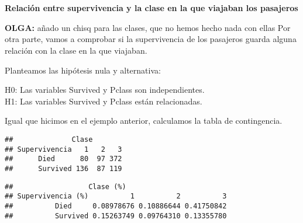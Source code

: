 \documentclass[
]{article}
\newenvironment{Shaded}{\begin{snugshade}}{\end{snugshade}}
\newcommand{\CommentTok}[1]{\textcolor[rgb]{0.56,0.35,0.01}{\textit{#1}}}
\newcommand{\DataTypeTok}[1]{\textcolor[rgb]{0.13,0.29,0.53}{#1}}
\newcommand{\KeywordTok}[1]{\textcolor[rgb]{0.13,0.29,0.53}{\textbf{#1}}}
\newcommand{\NormalTok}[1]{#1}
\newcommand{\OperatorTok}[1]{\textcolor[rgb]{0.81,0.36,0.00}{\textbf{#1}}}
\newcommand{\StringTok}[1]{\textcolor[rgb]{0.31,0.60,0.02}{#1}}
\begin{document}
\texttt{}\\
\texttt{}~\\
\textbf{Relación entre supervivencia y la clase en la que viajaban los
pasajeros}

\textbf{OLGA:} añado un chisq para las clases, que no hemos hecho nada
con ellas Por otra parte, vamos a comprobar si la supervivencia de los
pasajeros guarda alguna relación con la clase en la que viajaban.

Planteamos las hipótesis nula y alternativa:

H0: Las variables Survived y Pclass son independientes.\\
H1: Las variables Survived y Pclass están relacionadas.

Igual que hicimos en el ejemplo anterior, calculamos la tabla de
contingencia.

\begin{Shaded}
\end{Shaded}

\begin{verbatim}
##              Clase
## Supervivencia   1   2   3
##      Died      80  97 372
##      Survived 136  87 119
\end{verbatim}

\begin{Shaded}
\end{Shaded}

\begin{verbatim}
##                  Clase (%)
## Supervivencia (%)          1          2          3
##          Died     0.08978676 0.10886644 0.41750842
##          Survived 0.15263749 0.09764310 0.13355780
\end{verbatim}
\end{document}
